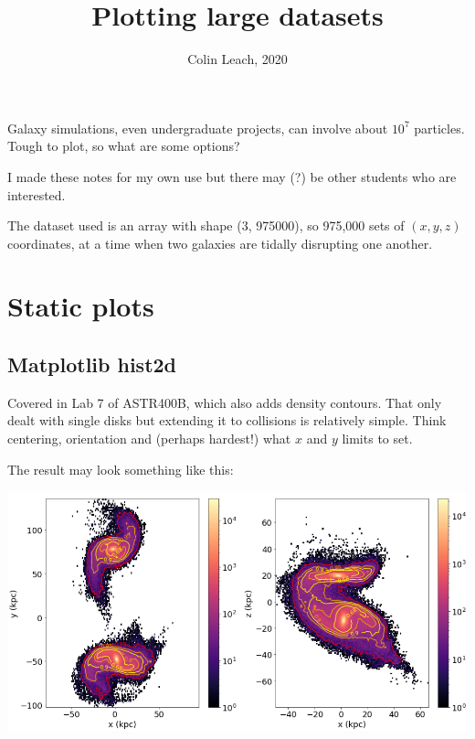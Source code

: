 

\setlength{\parskip}{0.2em}
\setlength{\skip\footins}{20pt}

\title{Plotting large datasets}
\author{Colin Leach, 2020}
\date{\vspace{-3ex}}



	
\maketitle

Galaxy simulations, even undergraduate projects, can involve about $10^7$ particles. Tough to plot, so what are some options?

I made these notes for my own use but there may (?) be other students who are interested.

The dataset used is an array with shape (3, 975000), so 975,000 sets of $(x,y,z)$ coordinates, at a time when two galaxies are tidally disrupting one another.

\section{Static plots}

\subsection{Matplotlib hist2d}

Covered in Lab 7 of ASTR400B, which also adds density contours. That only dealt with single disks but extending it to collisions is relatively simple. Think centering, orientation and (perhaps hardest!) what $x$ and $y$ limits to set.

The result may look something like this:

{\centering \includegraphics[scale=0.5]{mpl contours, 400b code} \par}

